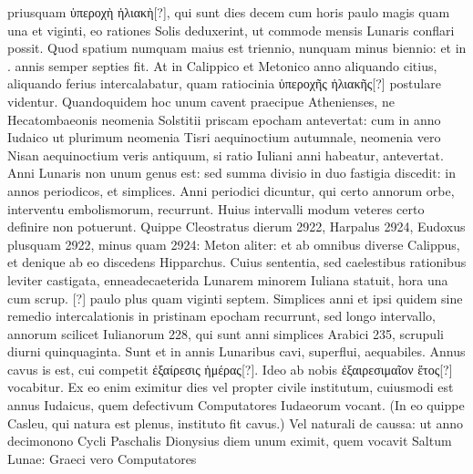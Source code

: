 priusquam \textgreek{ὑπεροχὴ ἡλιακὴ[?]}, qui sunt dies decem cum horis paulo
magis quam una et viginti, eo rationes Solis deduxerint, ut commode
mensis Lunaris conflari possit.
Quod spatium numquam maius est
triennio, nunquam minus biennio: et in . annis semper septies fit.
At in Calippico et Metonico anno aliquando citius, aliquando ferius
intercalabatur, quam ratiocinia \textgreek{ὑπεροχῆς ἡλιακῆς[?]}
 postulare videntur.
%
Quandoquidem hoc unum cavent praecipue Athenienses,
 ne Hecatombaeonis
neomenia Solstitii priscam epocham antevertat: cum in
anno Iudaico ut plurimum neomenia Tisri aequinoctium autumnale,
neomenia vero Nisan aequinoctium veris antiquum, si ratio Iuliani
anni habeatur, antevertat.
Anni Lunaris non unum genus est: sed
summa divisio in duo fastigia discedit: in annos periodicos, et simplices.
Anni periodici dicuntur, qui certo annorum orbe, interventu
embolismorum, recurrunt.
Huius intervalli modum veteres certo
definire non potuerunt.
Quippe Cleostratus dierum 2922, Harpalus
2924, Eudoxus plusquam 2922, minus quam 2924: Meton aliter:
et ab omnibus diverse Calippus, et denique ab eo discedens Hipparchus.
Cuius sententia, sed caelestibus rationibus leviter castigata,
 enneadecaeterida
Lunarem minorem Iuliana statuit, hora una cum scrup. [?] paulo
plus quam viginti septem.
Simplices anni et ipsi quidem sine remedio
intercalationis in pristinam epocham recurrunt, sed longo intervallo,
annorum scilicet Iulianorum 228, qui sunt anni simplices Arabici 235,
scrupuli diurni quinquaginta.
Sunt et in annis Lunaribus cavi, superflui,
aequabiles.
Annus cavus is est, cui competit \textgreek{ἐξαίρεσις ἡμέρας[?]}.
Ideo ab nobis \textgreek{ἐξαιρεσιμαῖον ἔτος[?]} vocabitur.
Ex eo enim eximitur dies
vel propter civile institutum, cuiusmodi est annus Iudaicus,
quem defectivum
Computatores Iudaeorum vocant.
(In eo quippe Casleu, qui natura est plenus, instituto fit cavus.)
Vel naturali de caussa: ut anno
decimonono Cycli Paschalis Dionysius diem unum eximit, quem
vocavit Saltum Lunae: Graeci vero Computatores
